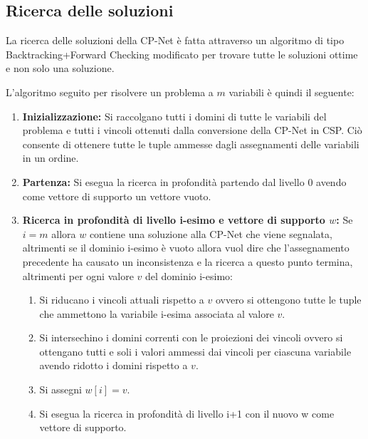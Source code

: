 \subsection{Ricerca delle soluzioni}
La ricerca delle soluzioni della CP-Net è fatta attraverso un
algoritmo di tipo Backtracking+Forward Checking modificato per trovare
tutte le soluzioni ottime e non solo una soluzione.

L'algoritmo seguito per risolvere un problema a $m$ variabili è quindi
il seguente:
\begin{enumerate}
\item \textbf{Inizializzazione:} Si raccolgano tutti i domini di tutte
  le variabili del problema e tutti i vincoli ottenuti dalla
  conversione della CP-Net in CSP. Ciò consente di ottenere tutte le
  tuple ammesse dagli assegnamenti delle variabili in un ordine.
\item \textbf{Partenza:} Si esegua la ricerca in profondità partendo
  dal livello 0 avendo come vettore di supporto un vettore vuoto.
\item \textbf{Ricerca in profondità di livello i-esimo e vettore di
    supporto $w$:} Se $i=m$ allora $w$ contiene una soluzione alla
  CP-Net che viene segnalata, altrimenti se il dominio i-esimo è vuoto
  allora vuol dire che l'assegnamento precedente ha causato un
  inconsistenza e la ricerca a questo punto termina, altrimenti per
  ogni valore $v$ del dominio i-esimo:
  \begin{enumerate}
  \item Si riducano i vincoli attuali rispetto a $v$ ovvero si
    ottengono tutte le tuple che ammettono la variabile i-esima
    associata al valore $v$.
  \item Si intersechino i domini correnti con le proiezioni dei
    vincoli ovvero si ottengano tutti e soli i valori ammessi dai
    vincoli per ciascuna variabile avendo ridotto i domini rispetto a
    $v$.
  \item Si assegni $w[i]=v$.
  \item Si esegua la ricerca in profondità di livello i+1 con il nuovo
    w come vettore di supporto.
  \end{enumerate}
\end{enumerate}